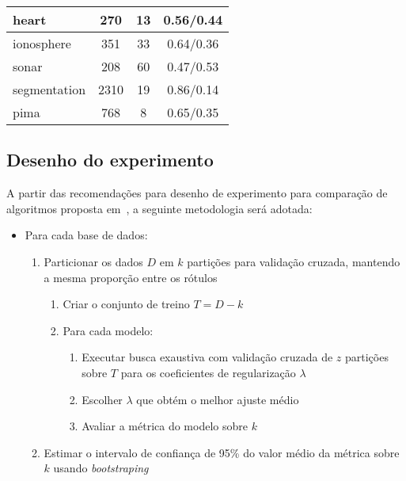 \documentclass[conference]{IEEEtran}
\begin{document}
\begin{table}[h!]
\begin{tabular}{|l|c|c|c|}
			heart                                  & 270                 & 13                 & 0.56/0.44          \\ \hline
			ionosphere                             & 351                 & 33                 & 0.64/0.36          \\ \hline
			sonar                                  & 208                 & 60                 & 0.47/0.53          \\ \hline
			segmentation                           & 2310                & 19                 & 0.86/0.14          \\ \hline
			pima                                   & 768                 & 8                  & 0.65/0.35          \\ \hline
		\end{tabular}
	\end{table}

	\subsection{Desenho do experimento}
	A partir das recomendações para desenho de experimento para comparação de algoritmos proposta em~\cite{salzberg1997comparing}, a seguinte metodologia será adotada:
	\begin{itemize}
		\item Para cada base de dados:
			\begin{enumerate}
			\item Particionar os dados $D$ em $k$ partições para validação cruzada, mantendo a mesma proporção entre os rótulos
			\begin{enumerate}
				\item Criar o conjunto de treino $T = D - k$
				\item Para cada modelo:
				\begin{enumerate}
					\item Executar busca exaustiva com validação cruzada de $z$ partições sobre $T$ para os coeficientes de regularização $\lambda$ \label{item:grid-search}
					\item Escolher $\lambda$ que obtém o melhor ajuste médio 
					\item Avaliar a métrica do modelo sobre $k$
				\end{enumerate}
			\end{enumerate}
			\item Estimar o intervalo de confiança de 95\% do valor médio da métrica sobre $k$ usando \textit{bootstraping}
		\end{enumerate}
	\end{itemize}
	
\end{document}
